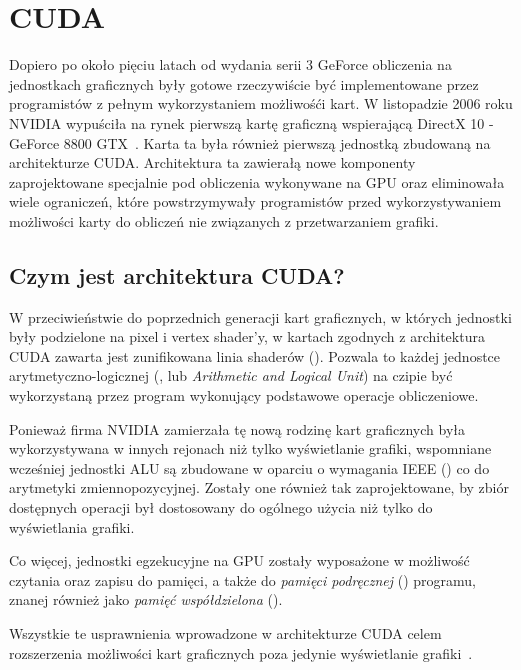 \section{CUDA}

Dopiero po około pięciu latach od wydania serii 3 GeForce obliczenia na jednostkach graficznych były gotowe rzeczywiście być implementowane przez programistów z pełnym wykorzystaniem możliwośći kart. W listopadzie 2006 roku NVIDIA wypuściła na rynek pierwszą kartę graficzną wspierającą DirectX 10 - GeForce 8800 GTX~\cite{nvidia:geforce8800}. Karta ta była również pierwszą jednostką zbudowaną na architekturze CUDA. Architektura ta zawierałą nowe komponenty zaprojektowane specjalnie pod obliczenia wykonywane na GPU oraz eliminowała wiele ograniczeń, które powstrzymywały programistów przed wykorzystywaniem możliwości karty do obliczeń nie związanych z przetwarzaniem grafiki.

\subsection{Czym jest architektura CUDA?}

W przeciwieństwie do poprzednich generacji kart graficznych, w których jednostki były podzielone na pixel i vertex shader'y, w kartach zgodnych z architektura CUDA zawarta jest zunifikowana linia shaderów (). Pozwala to każdej jednostce arytmetyczno-logicznej (,  lub \emph{Arithmetic and Logical Unit}) na czipie być wykorzystaną przez program wykonujący podstawowe operacje obliczeniowe.

Ponieważ firma NVIDIA zamierzała tę nową rodzinę kart graficznych była wykorzystywana w innych rejonach niż tylko wyświetlanie grafiki, wspomniane wcześniej jednostki ALU są zbudowane w oparciu o wymagania IEEE () co do arytmetyki zmiennopozycyjnej. Zostały one również tak zaprojektowane, by zbiór dostępnych operacji był dostosowany do ogólnego użycia niż tylko do wyświetlania grafiki. 

Co więcej, jednostki egzekucyjne na GPU zostały wyposażone w możliwość czytania oraz zapisu do pamięci, a także do \emph{pamięci podręcznej} () programu, znanej również jako \emph{pamięć współdzielona} ().

Wszystkie te usprawnienia wprowadzone w architekturze CUDA celem rozszerzenia możliwości kart graficznych poza jedynie wyświetlanie grafiki~\cite{Cuda:Example}.

